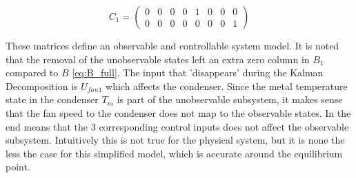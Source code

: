 %

\medskip

\begin{equation}  \label{eq:C1}
	C_1 =\left(\begin{array}{cccccccc}
		0 &    0 &    0 &    0 &    1 &    0 &    0 &    0 \\
		0 &    0 &    0 &    0 &    0 &    0 &    0 &    1
	\end{array}\right)
\end{equation}

These matrices define an observable and controllable system model. It is noted that the removal of the unobservable states left an extra zero column in $B_1$ compared to $ B $ \cref{eq:B_full}. The input that 'disappears' during the Kalman Decomposition is $ U_{fan1} $ which affects the condenser. Since the metal temperature state in the condenser $ T_m $ is part of the unobservable subsystem, it makes sense that the fan speed to the condenser does not map to the observable states.
In the end means that the 3 corresponding control inputs does not affect the observable subsystem. Intuitively this is not true for the physical system, but it is none the less the case for this simplified model, which is accurate around the equilibrium point.\\

